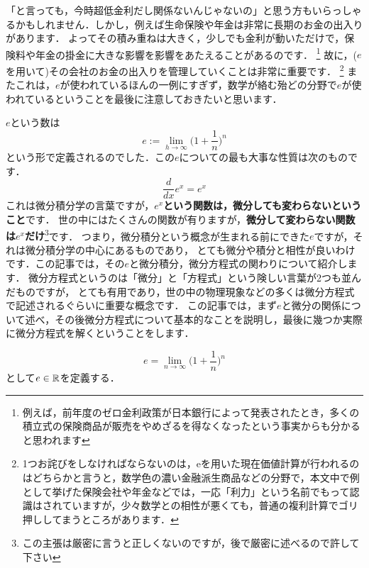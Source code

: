 「と言っても，今時超低金利だし関係ないんじゃないの」と思う方もいらっしゃるかもしれません．しかし，例えば生命保険や年金は非常に長期のお金の出入りがあります．
よってその積み重ねは大きく，少しでも金利が動いただけで，保険料や年金の掛金に大きな影響を影響をあたえることがあるのです．
\footnote{例えば，前年度のゼロ金利政策が日本銀行によって発表されたとき，多くの積立式の保険商品が販売をやめざるを得なくなったという事実からも分かると思われます}
故に，($e$を用いて)その会社のお金の出入りを管理していくことは非常に重要です．
\footnote{1つお詫びをしなければならないのは，eを用いた現在価値計算が行われるのはどちらかと言うと，数学色の濃い金融派生商品などの分野で，本文中で例として挙げた保険会社や年金などでは，一応「利力」という名前でもって認識はされていますが，少々数学との相性が悪くても，普通の複利計算でゴリ押ししてまうところがあります．}
またこれは，$e$が使われているほんの一例にすぎず，数学が絡む殆どの分野で$e$が使われているということを最後に注意しておきたいと思います．

$e$という数は
\[
e := \lim_{h \to \infty} \biggl( 1 + \frac{1}{n}\biggl)^n
\]
という形で定義されるのでした．この$e$についての最も大事な性質は次のものです．
\[
\frac{d}{dx} e^x = e^x
\]
これは微分積分学の言葉ですが，\textbf{$e^x$という関数は，微分しても変わらないということ}です．
世の中にはたくさんの関数が有りますが，\textbf{微分して変わらない関数は$e^x$だけ}\footnote{この主張は厳密に言うと正しくないのですが，後で厳密に述べるので許して下さい}です．
つまり，微分積分という概念が生まれる前にできた$e$ですが，それは微分積分学の中心にあるものであり，
とても微分や積分と相性が良いわけです．この記事では，その$e$と微分積分，微分方程式の関わりについて紹介します．
微分方程式というのは「微分」と「方程式」という険しい言葉が2つも並んだものですが，
とても有用であり，世の中の物理現象などの多くは微分方程式で記述されるぐらいに重要な概念です．
この記事では，まず$e$と微分の関係について述べ，その後微分方程式について基本的なことを説明し，最後に幾つか実際に微分方程式を解くということをします．

\[
e = \lim_{n \to \infty} \biggl( 1 + \frac{1}{n}\biggl)^n
\]
として$e \in \mathbb R$を定義する．

